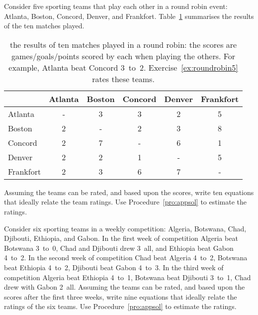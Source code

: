 \begin{exercise} \label{ex:roundrobin5} 
Consider five sporting teams that play each other in a round robin  event: Atlanta, Boston, Concord, Denver, and Frankfort.
Table~\ref{tbl:roundrobin5} summarises the results of the ten matches played.
\begin{table}
\caption{the results of ten matches played in a round robin: the scores are games\slash goals\slash points scored by each when playing the others.  For example, Atlanta beat Concord 3~to~2.  Exercise~\ref{ex:roundrobin5} rates these teams.}
\label{tbl:roundrobin5}
\begin{center}
\begin{tabular}{@{}l|ccccc@{}} \hline
&Atlanta& Boston& Concord& Denver&Frankfort\\ \hline
Atlanta & - & 3 & 3 & 2 & 5 \\
Boston & 2 & - & 2 & 3 & 8 \\
Concord & 2 & 7 & - & 6 & 1 \\
Denver & 2 & 2 & 1 & - & 5 \\ 
Frankfort& 2 & 3 & 6 & 7 & - \\\hline
\end{tabular}
\end{center}
\end{table}%
Assuming the teams can be rated, and  based upon the scores, write ten equations that ideally relate the team ratings.  
Use Procedure~\ref{pro:appsol} to estimate the ratings.
\end{exercise}




\begin{exercise} \label{ex:roundrobin6} 
Consider six sporting teams in a weekly competition: Algeria, Botswana, Chad, Djibouti, Ethiopia, and Gabon.
In the first week of competition 
Algeria beat Botswana 3~to~0, 
Chad and Djibouti drew 3~all, and 
Ethiopia beat Gabon 4~to~2.
In the second week of competition 
Chad beat Algeria 4~to~2, 
Botswana beat Ethiopia 4~to~2,
Djibouti beat Gabon 4~to~3.
In the third week of competition 
Algeria beat Ethiopia 4~to~1, 
Botswana beat Djibouti 3~to~1,
Chad drew with Gabon 2~all.
Assuming the teams can be rated, and  based upon the scores after the first three weeks, write nine equations that ideally relate the ratings of the six teams.  
Use Procedure~\ref{pro:appsol} to estimate the ratings.
\end{exercise}







